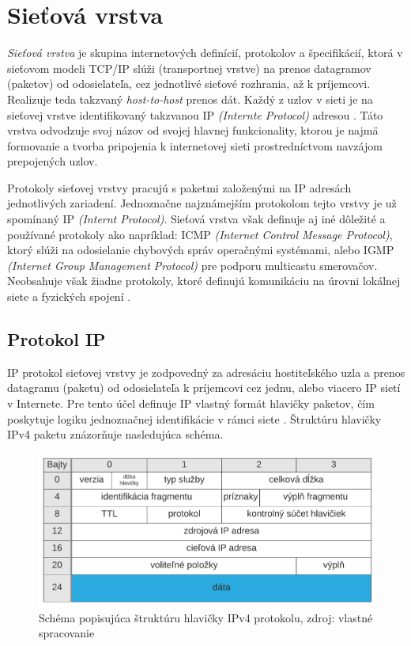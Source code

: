 \documentclass[
  digital, %
  oneside, %
  table,   %
  lof,     %
  nolot,   %
  nocover
]{fithesis3}
\begin{document}
\section{Sieťová vrstva}
\textit{Sieťová vrstva} je skupina internetových definícií, protokolov a špecifikácií, ktorá
v sieťovom modeli TCP/IP slúži (transportnej vrstve) na prenos datagramov
(paketov) od odosielateľa, cez jednotlivé sieťové rozhrania, až k príjemcovi.
Realizuje teda takzvaný \textit{host-to-host} prenos dát.
Každý z uzlov v sieti je na sieťovej vrstve identifikovaný takzvanou IP
\textit{(Internte Protocol)} adresou \cite{rfc791}. Táto vrstva odvodzuje svoj názov od
svojej hlavnej funkcionality, ktorou je najmä formovanie a tvorba pripojenia k
internetovej sieti prostredníctvom navzájom prepojených uzlov.

Protokoly sieťovej vrstvy pracujú s paketmi založenými na IP adresách
jednotlivých zariadení. Jednoznačne najznámejším protokolom tejto vrstvy je už
spomínaný IP \textit{(Internt Protocol)}. Sieťová vrstva však definuje aj iné
dôležité a používané protokoly ako napríklad: ICMP
\textit{(Internet Control Message Protocol)}, ktorý slúži na odosielanie
chybových správ operačnými systémami, alebo IGMP
\textit{(Internet Group Management Protocol)} pre podporu multicastu smerovačov.
Neobsahuje však žiadne protokoly, ktoré definujú komunikáciu na
úrovni lokálnej siete a fyzických spojení \cite{rfc1122}.

\subsection{Protokol IP}
IP protokol sieťovej vrstvy je zodpovedný za adresáciu hostiteľského uzla a
prenos datagramu (paketu) od odosielateľa k príjemcovi cez jednu, alebo viacero
IP sietí v Internete. Pre tento účel definuje IP vlastný formát hlavičky paketov, čím
poskytuje logiku jednoznačnej identifikácie v rámci siete \cite{rfc791}. Štruktúru hlavičky
IPv4 paketu znázorňuje nasledujúca schéma.

\begin{figure}[h]
  \centering
    \includegraphics[width=.95\textwidth]{images/net-ip-head.png}
  \caption{Schéma popisujúca štruktúru hlavičky IPv4 protokolu, zdroj: vlastné spracovanie}
  \label{fig:net-ip-head}
\end{figure}
\end{document}
